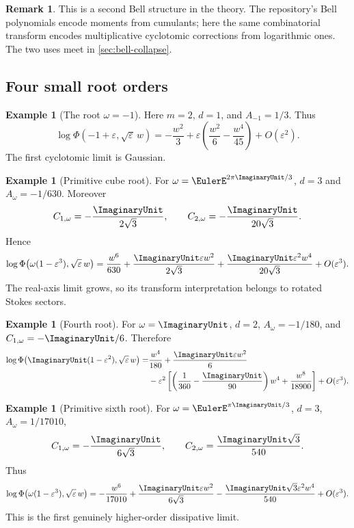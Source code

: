 \documentclass[11pt]{article}
\theoremstyle{definition}
\newtheorem{example}[theorem]{Example}
\newtheorem{remark}[theorem]{Remark}
\newcommand{\eps}{\varepsilon}
\begin{document}
\begin{remark}
This is a second Bell structure in the theory.  The repository's Bell polynomials encode moments from cumulants; here the same combinatorial transform encodes multiplicative cyclotomic corrections from logarithmic ones.  The two uses meet in \cref{sec:bell-collapse}.
\end{remark}

\subsection{Four small root orders}

\begin{example}[The root $\omega=-1$]
Here $m=2$, $d=1$, and $A_{-1}=1/3$.  Thus
\begin{equation}
 \log\Phi(-1+\eps,\sqrt\eps\,w)
 =-\frac{w^2}{3}
 +\eps\left(\frac{w^2}{6}-\frac{w^4}{45}\right)
 +O(\eps^2).
 \label{eq:m2}
\end{equation}
The first cyclotomic limit is Gaussian.
\end{example}

\begin{example}[Primitive cube root]
For $\omega=\EulerE^{2\pi\ImaginaryUnit/3}$, $d=3$ and $A_\omega=-1/630$.  Moreover
\[
 C_{1,\omega}=-\frac{\ImaginaryUnit}{2\sqrt3},
 \qquad
 C_{2,\omega}=-\frac{\ImaginaryUnit}{20\sqrt3}.
\]
Hence
\begin{equation}
 \log\Phi\bigl(\omega(1-\eps^3),\sqrt\eps\,w\bigr)
 =\frac{w^6}{630}
 +\frac{\ImaginaryUnit\eps w^2}{2\sqrt3}
 +\frac{\ImaginaryUnit\eps^2w^4}{20\sqrt3}
 +O(\eps^3).
 \label{eq:m3}
\end{equation}
The real-axis limit grows, so its transform interpretation belongs to rotated Stokes sectors.
\end{example}

\begin{example}[Fourth root]
For $\omega=\ImaginaryUnit$, $d=2$, $A_\omega=-1/180$, and $C_{1,\omega}=-\ImaginaryUnit/6$.  Therefore
\begin{align}
 \log\Phi\bigl(\ImaginaryUnit(1-\eps^2),\sqrt\eps\,w\bigr)
 =&\frac{w^4}{180}+\frac{\ImaginaryUnit\eps w^2}{6}
 \label{eq:m4-first}\\
 &-\eps^2\left[
 \left(\frac1{360}-\frac{\ImaginaryUnit}{90}\right)w^4
 +\frac{w^8}{18900}
 \right]+O(\eps^3).
 \label{eq:m4-second}
\end{align}
\end{example}

\begin{example}[Primitive sixth root]
For $\omega=\EulerE^{\pi\ImaginaryUnit/3}$, $d=3$, $A_\omega=1/17010$,
\[
 C_{1,\omega}=-\frac{\ImaginaryUnit}{6\sqrt3},
 \qquad
 C_{2,\omega}=\frac{\ImaginaryUnit\sqrt3}{540}.
\]
Thus
\begin{equation}
 \log\Phi\bigl(\omega(1-\eps^3),\sqrt\eps\,w\bigr)
 =-\frac{w^6}{17010}
 +\frac{\ImaginaryUnit\eps w^2}{6\sqrt3}
 -\frac{\ImaginaryUnit\sqrt3\eps^2w^4}{540}
 +O(\eps^3).
 \label{eq:m6}
\end{equation}
This is the first genuinely higher-order dissipative limit.
\end{example}
\end{document}
